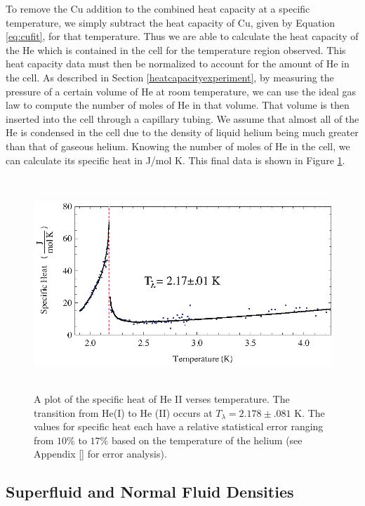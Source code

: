To remove the Cu addition to the combined heat capacity at a specific temperature, we simply subtract the heat capacity of Cu, given by Equation \ref{eq:cufit}, for that temperature. Thus we are able to calculate the heat capacity of the He which is contained in the cell for the temperature region observed.  This heat capacity data must then be normalized to account for the amount of He in the cell. As described in Section \ref{heatcapacityexperiment}, by measuring the pressure of a certain volume of He at room temperature, we can use the ideal gas law to compute the number of moles of He in that volume.  That volume is then inserted into the cell through a capillary tubing.  We assume that almost all of the He is condensed in the cell due to the density of liquid helium being much greater than that of gaseous helium.  Knowing the number of moles of He in the cell, we can calculate its specific heat in J/mol K. This final data is shown in Figure \ref{fig:lambdatrans}.

\begin{figure}[htbp]
\begin{center}
\includegraphics[height=80mm]{./figures/lambdatrans.eps}
\caption{\small{A plot of the specific heat of He II verses temperature. The transition from He(I) to He (II) occurs at $T_{\lambda} = 2.178 \pm .081$ K.  The values for specific heat each have a relative statistical error ranging from $10\%$  to $17\%$ based on the temperature of the helium (see Appendix \ref{} for error analysis).}}
\label{fig:lambdatrans}
\end{center}
\end{figure}

\subsection{Superfluid and Normal Fluid Densities}\label{superfluiddensity}


